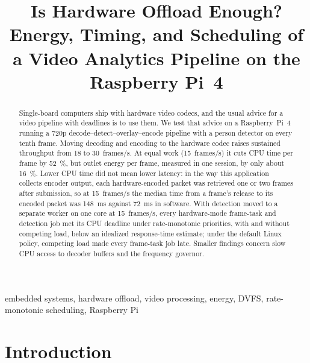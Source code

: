 \documentclass[conference]{IEEEtran}
\begin{document}
\title{Is Hardware Offload Enough? Energy, Timing, and Scheduling of a Video Analytics Pipeline on the Raspberry Pi~4}

\author{
}

\maketitle

\begin{abstract}
Single-board computers ship with hardware video codecs, and the usual advice for a video pipeline with deadlines is to use them. We test that advice on a Raspberry~Pi~4 running a 720p decode--detect--overlay--encode pipeline with a person detector on every tenth frame. Moving decoding and encoding to the hardware codec raises sustained throughput from 18 to 30~frames/s. At equal work (15~frames/s) it cuts CPU time per frame by \SI{52}{\percent}, but outlet energy per frame, measured in one session, by only about \SI{16}{\percent}. Lower CPU time did not mean lower latency: in the way this application collects encoder output, each hardware-encoded packet was retrieved one or two frames after submission, so at 15~frames/s the median time from a frame's release to its encoded packet was \SI{148}{\milli\second} against \SI{72}{\milli\second} in software. With detection moved to a separate worker on one core at 15~frames/s, every hardware-mode frame-task and detection job met its CPU deadline under rate-monotonic priorities, with and without competing load, below an idealized response-time estimate; under the default Linux policy, competing load made every frame-task job late. Smaller findings concern slow CPU access to decoder buffers and the frequency governor.
\end{abstract}

\begin{IEEEkeywords}
embedded systems, hardware offload, video processing, energy, DVFS, rate-monotonic scheduling, Raspberry Pi
\end{IEEEkeywords}

\section{Introduction}
\end{document}
